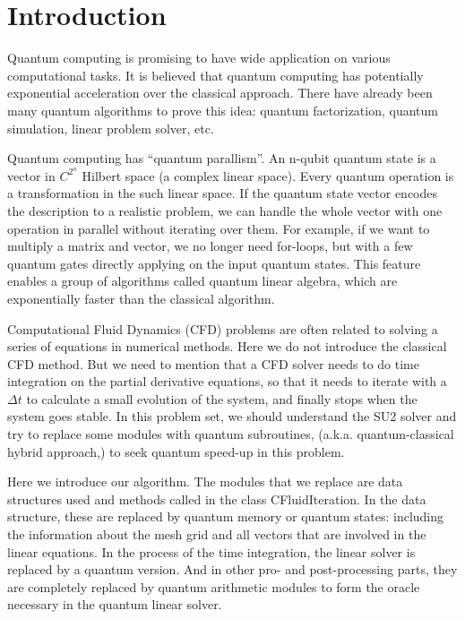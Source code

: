 \documentclass[%
 reprint,
 amsmath,amssymb,
pra,
]{revtex4-1}
\begin{document}

\maketitle

\section{Introduction}
Quantum computing is promising to have wide application on various computational tasks. It is believed that quantum computing has potentially exponential acceleration over the classical approach. There have already been many quantum algorithms to prove this idea: quantum factorization, quantum simulation, linear problem solver, etc. 

Quantum computing has “quantum parallism”. An n-qubit quantum state is a vector in $C^{2^n}$ Hilbert space (a complex linear space). Every quantum operation is a transformation in the such linear space. If the quantum state vector encodes the description to a realistic problem, we can handle the whole vector with one operation in parallel without iterating over them. For example, if we want to multiply a matrix and vector, we no longer need for-loops, but with a few quantum gates directly applying on the input quantum states. This feature enables a group of algorithms called quantum linear algebra, which are exponentially faster than the classical algorithm.

Computational Fluid Dynamics (CFD) problems are often related to solving a series of equations in numerical methods. Here we do not introduce the classical CFD method. But we need to mention that a CFD solver needs to do time integration on the partial derivative equations, so that it needs to iterate with a $\Delta t$ to calculate a small evolution of the system, and finally stops when the system goes stable. In this problem set, we should understand the SU2 solver and try to replace some modules with quantum subroutines, (a.k.a. quantum-classical hybrid approach,) to seek quantum speed-up in this problem.

Here we introduce our algorithm. The modules that we replace are data structures used and methods called in the class CFluidIteration. In the data structure, these are replaced by quantum memory or quantum states: including the information about the mesh grid and all vectors that are involved in the linear equations. In the process of the time integration, the linear solver is replaced by a quantum version. And in other pro- and post-processing parts, they are completely replaced by quantum arithmetic modules to form the oracle necessary in the quantum linear solver.
\end{document}

